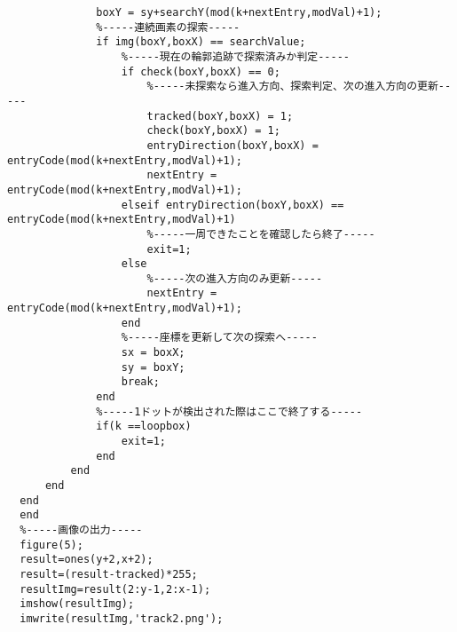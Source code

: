 \documentclass[a4j]{jarticle}
\begin{document}
\begin{verbatim}
              boxY = sy+searchY(mod(k+nextEntry,modVal)+1);
              %-----連続画素の探索-----
              if img(boxY,boxX) == searchValue;
                  %-----現在の輪郭追跡で探索済みか判定-----
                  if check(boxY,boxX) == 0;
                      %-----未探索なら進入方向、探索判定、次の進入方向の更新-----
                      tracked(boxY,boxX) = 1;
                      check(boxY,boxX) = 1;
                      entryDirection(boxY,boxX) = entryCode(mod(k+nextEntry,modVal)+1);
                      nextEntry = entryCode(mod(k+nextEntry,modVal)+1);
                  elseif entryDirection(boxY,boxX) == entryCode(mod(k+nextEntry,modVal)+1)
                      %-----一周できたことを確認したら終了-----
                      exit=1;
                  else
                      %-----次の進入方向のみ更新-----
                      nextEntry = entryCode(mod(k+nextEntry,modVal)+1);
                  end
                  %-----座標を更新して次の探索へ-----
                  sx = boxX;
                  sy = boxY;
                  break;
              end
              %-----1ドットが検出された際はここで終了する-----
              if(k ==loopbox)
                  exit=1;
              end
          end
      end
  end
  end
  %-----画像の出力-----
  figure(5);
  result=ones(y+2,x+2);
  result=(result-tracked)*255;
  resultImg=result(2:y-1,2:x-1);
  imshow(resultImg);
  imwrite(resultImg,'track2.png');
\end{verbatim}
\end{document}
